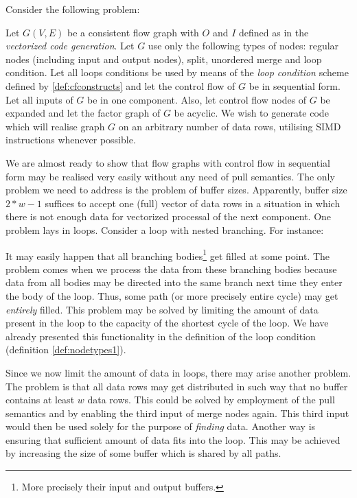 
Consider the following problem:

      Let $G(V,E)$ be a consistent flow graph with $O$ and $I$ defined as in the \emph{vectorized code generation}. Let $G$ use only the following types of nodes: regular nodes (including input and output nodes), split, unordered merge and loop condition. Let all loops conditions be used by means of the \emph{loop condition} scheme defined by \ref{def:cfconstructs} and let the control flow of $G$ be in sequential form. Let all inputs of $G$ be in one component. Also, let control flow nodes of $G$ be expanded and let the factor graph of $G$ be acyclic. We wish to generate code which will realise graph $G$ on an arbitrary number of data rows, utilising SIMD instructions whenever possible. 
\myendprob

  We are almost ready to show that flow graphs with control flow in sequential form may be realised very easily without any need of pull semantics. The only problem we need to address is the problem of buffer sizes. Apparently, buffer size $2*w-1$ suffices to accept one (full) vector of data rows in a situation in which there is not enough data for vectorized processal of the next component. One problem lays in loops.  Consider a loop with nested branching. For instance:


  It may easily happen that all branching bodies\footnote{More precisely their input and output buffers.} get filled at some point. The problem comes when we process the data from these branching bodies because data from all bodies may be directed into the same branch next time they enter the body of the loop. Thus, some path (or more precisely entire cycle) may get \emph{entirely} filled. This problem may be solved by limiting the amount of data present in the loop to the capacity of the shortest cycle of the loop. We have already presented this functionality in the definition of the loop condition (definition \ref{def:nodetypes1}). 

  Since we now limit the amount of data in loops, there may arise another problem. The problem is that all data rows may get distributed in such way that no buffer contains at least $w$ data rows. This could be solved by employment of the pull semantics and by enabling the third input of merge nodes again. This third input would then be used solely for the purpose of \emph{finding} data. Another way is ensuring that sufficient amount of data fits into the loop. This may be achieved by increasing the size of some buffer which is shared by all paths.

